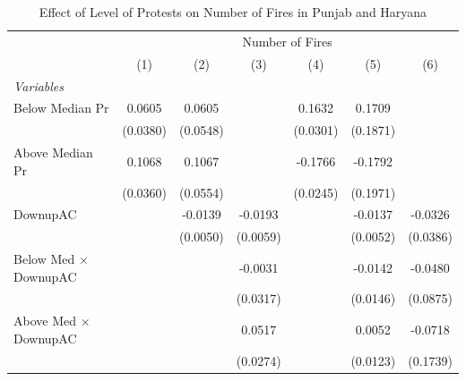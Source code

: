 
\begin{table}[htbp]
   \caption{\label{tab:protest_treat_main} Effect of Level of Protests on Number of Fires in Punjab and Haryana}
   \centering
   \begin{tabular}{lcccccc}
      \tabularnewline \midrule \midrule
       & \multicolumn{6}{c}{Number of Fires}\\
                                                              & (1)           & (2)           & (3)           & (4)           & (5)           & (6)\\  
      \midrule
      \emph{Variables}\\
      Below Median Pr                                         & 0.0605        & 0.0605        &               & 0.1632        & 0.1709        &   \\   
                                                              & (0.0380)      & (0.0548)      &               & (0.0301)      & (0.1871)      &   \\   
      Above Median Pr                                         & 0.1068        & 0.1067        &               & -0.1766       & -0.1792       &   \\   
                                                              & (0.0360)      & (0.0554)      &               & (0.0245)      & (0.1971)      &   \\   
      DownupAC                                                &               & -0.0139       & -0.0193       &               & -0.0137       & -0.0326\\   
                                                              &               & (0.0050)      & (0.0059)      &               & (0.0052)      & (0.0386)\\   
      Below Med $\times$ DownupAC                             &               &               & -0.0031       &               & -0.0142       & -0.0480\\   
                                                              &               &               & (0.0317)      &               & (0.0146)      & (0.0875)\\   
      Above Med $\times$ DownupAC                             &               &               & 0.0517        &               & 0.0052        & -0.0718\\   
                                                              &               &               & (0.0274)      &               & (0.0123)      & (0.1739)\\   

\end{tabular}
\end{table}
